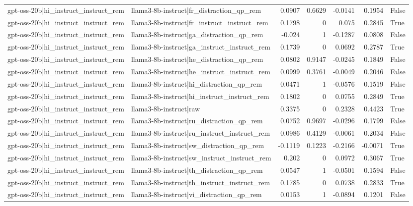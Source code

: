 \begin{table}
\begin{tabular}{l l r r r r l}
gpt-oss-20b|hi_instruct_instruct_rem & llama3-8b-instruct|fr_distraction_qp_rem & 0.0907 & 0.6629 & -0.0141 & 0.1954 & False \\
gpt-oss-20b|hi_instruct_instruct_rem & llama3-8b-instruct|fr_instruct_instruct_rem & 0.1798 & 0 & 0.075 & 0.2845 & True \\
gpt-oss-20b|hi_instruct_instruct_rem & llama3-8b-instruct|ga_distraction_qp_rem & -0.024 & 1 & -0.1287 & 0.0808 & False \\
gpt-oss-20b|hi_instruct_instruct_rem & llama3-8b-instruct|ga_instruct_instruct_rem & 0.1739 & 0 & 0.0692 & 0.2787 & True \\
gpt-oss-20b|hi_instruct_instruct_rem & llama3-8b-instruct|he_distraction_qp_rem & 0.0802 & 0.9147 & -0.0245 & 0.1849 & False \\
gpt-oss-20b|hi_instruct_instruct_rem & llama3-8b-instruct|he_instruct_instruct_rem & 0.0999 & 0.3761 & -0.0049 & 0.2046 & False \\
gpt-oss-20b|hi_instruct_instruct_rem & llama3-8b-instruct|hi_distraction_qp_rem & 0.0471 & 1 & -0.0576 & 0.1519 & False \\
gpt-oss-20b|hi_instruct_instruct_rem & llama3-8b-instruct|hi_instruct_instruct_rem & 0.1802 & 0 & 0.0755 & 0.2849 & True \\
gpt-oss-20b|hi_instruct_instruct_rem & llama3-8b-instruct|raw & 0.3375 & 0 & 0.2328 & 0.4423 & True \\
gpt-oss-20b|hi_instruct_instruct_rem & llama3-8b-instruct|ru_distraction_qp_rem & 0.0752 & 0.9697 & -0.0296 & 0.1799 & False \\
gpt-oss-20b|hi_instruct_instruct_rem & llama3-8b-instruct|ru_instruct_instruct_rem & 0.0986 & 0.4129 & -0.0061 & 0.2034 & False \\
gpt-oss-20b|hi_instruct_instruct_rem & llama3-8b-instruct|sw_distraction_qp_rem & -0.1119 & 0.1223 & -0.2166 & -0.0071 & True \\
gpt-oss-20b|hi_instruct_instruct_rem & llama3-8b-instruct|sw_instruct_instruct_rem & 0.202 & 0 & 0.0972 & 0.3067 & True \\
gpt-oss-20b|hi_instruct_instruct_rem & llama3-8b-instruct|th_distraction_qp_rem & 0.0547 & 1 & -0.0501 & 0.1594 & False \\
gpt-oss-20b|hi_instruct_instruct_rem & llama3-8b-instruct|th_instruct_instruct_rem & 0.1785 & 0 & 0.0738 & 0.2833 & True \\
gpt-oss-20b|hi_instruct_instruct_rem & llama3-8b-instruct|vi_distraction_qp_rem & 0.0153 & 1 & -0.0894 & 0.1201 & False \\

\end{tabular}
\end{table}
